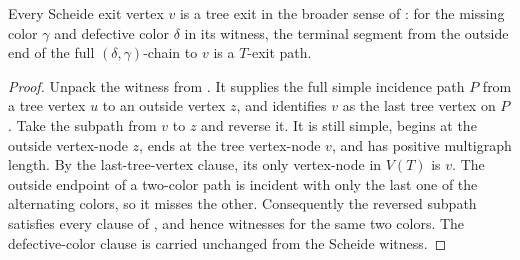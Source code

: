 \begin{lemma}
Every Scheide exit vertex $v$ is a tree exit in the broader sense of
: for the missing color $\gamma$ and defective color
$\delta$ in its witness, the terminal segment from the outside end of the
full $(\delta,\gamma)$-chain to $v$ is a $T$-exit path.
\end{lemma}
\begin{proof}
Unpack the witness from .  It supplies the full
simple incidence path $P$ from a tree vertex $u$ to an outside vertex $z$,
and identifies $v$ as the last tree vertex on $P$.  Take the subpath from
$v$ to $z$ and reverse it.  It is still simple, begins at the outside
vertex-node $z$, ends at the tree vertex-node $v$, and has positive
multigraph length.  By the last-tree-vertex clause, its only vertex-node
in $V(T)$ is $v$.  The outside endpoint of a two-color path is incident
with only the last one of the alternating colors, so it misses the other.
Consequently the reversed subpath satisfies every clause of
, and hence witnesses
 for the same two colors.  The defective-color clause is
carried unchanged from the Scheide witness.
\end{proof}

